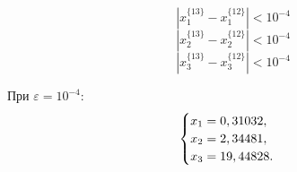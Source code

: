 \documentclass[10pt, a4paper, titlepage]{article}
\begin{document}
$$|x_1^{\{13\}}-x_1^{\{12\}}|<10^{-4}$$
$$|x_2^{\{13\}}-x_2^{\{12\}}|<10^{-4}$$
$$|x_3^{\{13\}}-x_3^{\{12\}}|<10^{-4}$$

При $\varepsilon=10^{-4}$:
\begin{equation*}
    \begin{cases}
        $$x_1=0,31032$$, \\
        $$x_2=2,34481$$, \\
        $$x_3=19,44828$$.
    \end{cases}
\end{equation*}
\end{document}
